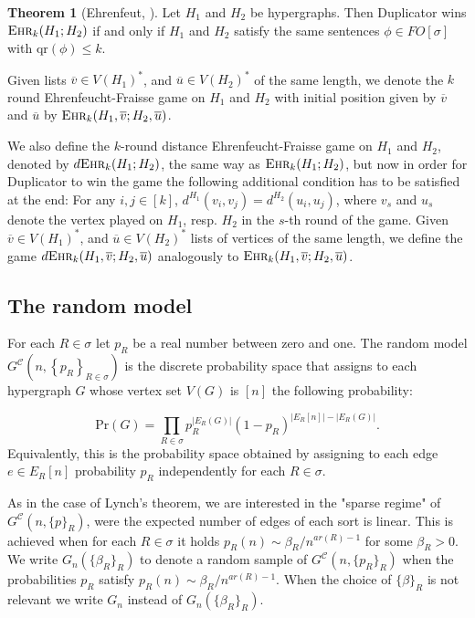 \documentclass[12pt,notitlepage,a4paper]{article}
\theoremstyle{definition}
\newtheorem{theorem}{Theorem}[section]
\newcommand{\ehr}{\textsc{Ehr}}
\newcommand{\InR}[1]{\left\{ #1_R \right\}_{R\in \sigma}}
\newcommand{\qr}{\mathrm{qr}}
\begin{document}
\begin{theorem}
	[Ehrenfeut, \citealp{ehrenfeucht1961application}] Let
	$H_1$ and $H_2$ be hypergraphs.
	Then Duplicator wins $\ehr_k(H_1;H_2)$
	if and only if $H_1$ and $H_2$ satisfy the same 
	sentences $\phi\in FO[\sigma]$ with $\qr(\phi)\leq k$.		
\end{theorem}

Given lists $\overline{v}\in V(H_1)^*$, and 
$\overline{u}\in V(H_2)^*$ of the same length, 
we denote the $k$ round 
Ehrenfeucht-Fraisse game on $H_1$ and $H_2$ with initial position given
by $\overline{v}$ and $\overline{u}$ by $\ehr_k(H_1,\overline{v};H_2,\overline{u})$.\par

We also define the $k$-round distance Ehrenfeucht-Fraisse game on 
$H_1$ and $H_2$, denoted by $d\ehr_k(H_1;H_2)$, the same way as
$\ehr_k(H_1;H_2)$, but now in order for Duplicator to win the
game the following additional condition has to be satisfied 
at the end: For any $i,j\in [k]$, $d^{H_1}(v_i,v_j)=d^{H_2}(u_i,u_j)$,
where $v_s$ and $u_s$ denote the vertex played on $H_1$, resp. $H_2$ in the 
$s$-th round of the game. 
Given $\overline{v}\in V(H_1)^*$, and $\overline{u}\in V(H_2)^*$
lists of vertices of the same length,
we define the game 
$d\ehr_k(H_1,\overline{v};H_2,\overline{u})$ analogously to 
$\ehr_k(H_1,\overline{v};H_2,\overline{u})$.


\subsection{The random model} \label{sect:random}

For each $R\in \sigma$ let
$p_R$ be a real number between zero and one.
The random model $G^{\mathcal{C}}\left(n,\InR{p}\right)$ 
is the discrete probability space that
assigns to each hypergraph $G$ whose vertex
set $V(G)$ is $[n]$ the following probability:

\[ \mathrm{Pr}(G)=\prod_{R\in \sigma} p_R^{|E_R(G)|}
(1-p_R)^{ \big|E_R[n]\big|-\big|E_R(G)\big|}.	
\]
Equivalently, this is the probability space obtained by 
assigning to each edge $e\in E_R[n]$ probability 
$p_R$ independently for each $R\in \sigma$. \par

As in the case of Lynch's theorem, we are interested in the
"sparse regime" of $G^\mathcal{C}(n,\{p\}_R)$, were the 
expected number of edges of each sort is linear. 
This is achieved when for each $R\in \sigma$ 
it holds $p_R(n)\sim \beta_R/n^{ar(R)-1}$ for some 
$\beta_R>0$.
We write $G_n\left(\{\beta_R\}_R\right)$
to denote a random sample of 
$G^\mathcal{C}\left(n,\{p_R\}_{R}\right)$
when the probabilities $p_R$ satisfy
$p_R(n)\sim \beta_R/n^{ar(R)-1}$.
When the choice of $\{\beta\}_R$ is not relevant
we write $G_n$ instead of 
$G_n\left(\{\beta_R\}_R\right)$.\par
\end{document}
